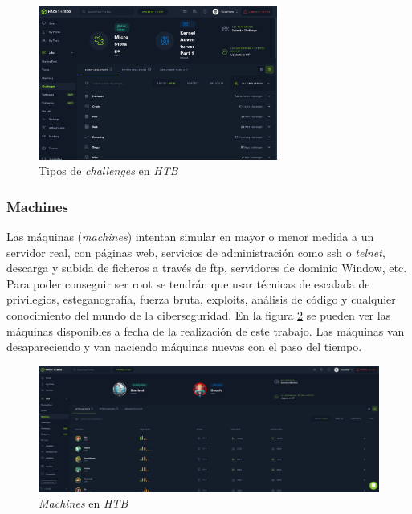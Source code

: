 \begin{figure}[h]
    \centering
    \includegraphics[width=0.7\textwidth]{images/sections/stateOfTheArt/htb-challenges.png}
    \caption{Tipos de \textit{challenges} en \textit{\acrshort{HTB}}}
    \label{fig:htb-challenges}
\end{figure}

\subsubsection{Machines}
Las máquinas (\textit{machines}) intentan simular en mayor o menor medida a un servidor real, con páginas web, servicios de administración como \acrshort{ssh} o \textit{telnet}, descarga y subida de ficheros a través de \acrshort{ftp}, servidores de dominio Window, etc. Para poder conseguir ser root se tendrán que usar técnicas de escalada de privilegios, esteganografía, fuerza bruta, exploits, análisis de código y cualquier conocimiento del mundo de la ciberseguridad. En la figura \ref{fig:htb-machines} se pueden ver las máquinas disponibles a fecha de la realización de este trabajo. Las máquinas van desapareciendo y van naciendo máquinas nuevas con el paso del tiempo.\\

\begin{figure}[h]
    \centering
    \includegraphics[width=1.0\textwidth]{images/sections/stateOfTheArt/htb-machines.png}
    \caption{\textit{Machines} en \textit{\acrshort{HTB}}}
    \label{fig:htb-machines}
\end{figure}

